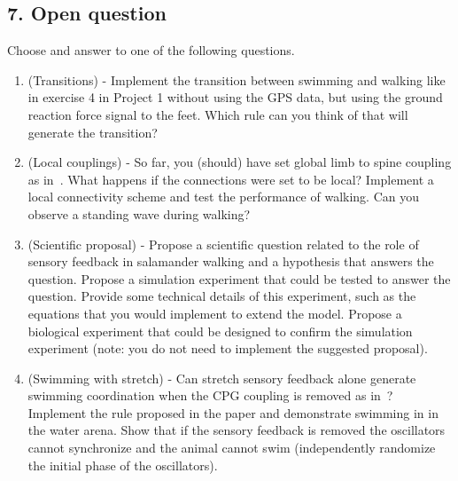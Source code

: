 \documentclass{cmc}
\begin{document}


\newpage
\subsection*{7. Open question}\label{sec:open_questions}
Choose and answer to one of the following questions.
\begin{enumerate}
\item (Transitions) - Implement the transition between swimming and walking like in exercise 4 in Project 1 without using the GPS data, but using the ground reaction force signal to the feet. Which rule can you think of that will generate the transition?
\item (Local couplings) - So far, you (should) have set global limb to spine coupling as in~\cite{ijspeert2007swimming}. What happens if the connections were set to be local? Implement a local connectivity scheme and test the performance of walking. Can you observe a standing wave during walking?
\item (Scientific proposal) - Propose a scientific question related to the role of sensory feedback in salamander walking and a hypothesis that answers the question. Propose a simulation experiment that could be tested to answer the question. Provide some technical details of this experiment, such as the equations that you would implement to extend the model. Propose a biological experiment that could be designed to confirm the simulation experiment (note: you do not need to implement the suggested proposal).
\item (Swimming with stretch) - Can stretch sensory feedback alone generate swimming coordination when the CPG coupling is removed as in~\cite{thandiackal2021emergence}? Implement the rule proposed in the paper and demonstrate swimming in in the water arena. Show that if the sensory feedback is removed the oscillators cannot synchronize and the animal cannot swim (independently randomize the initial phase of the oscillators).
\end{enumerate}



% 
\end{document}
